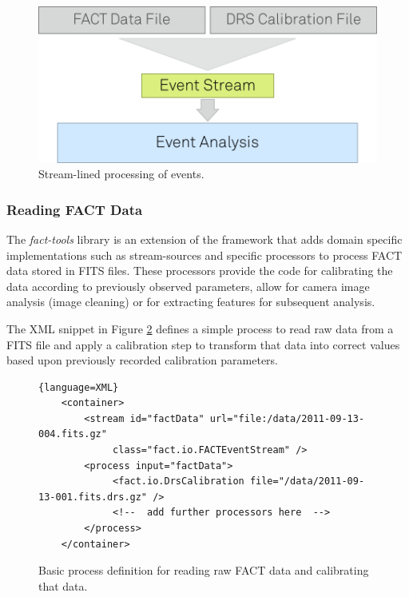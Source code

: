 %

\begin{figure}[h!]
\begin{center}
\includegraphics[scale=0.2]{fact-event-stream}
\end{center}
\caption{\label{fig:eventStream}Stream-lined processing of events.}
\end{figure}





\subsubsection{Reading FACT Data}
The {\em fact-tools} library is an extension of the \streams framework that
adds domain specific implementations such as stream-sources and specific 
processors to process FACT data stored in FITS files. These processors provide
the code for calibrating the data according to previously observed parameters,
allow for camera image analysis (image cleaning) or for extracting features
for subsequent analysis.

The XML snippet in Figure \ref{fig:readFACTxml} defines a simple process to
read raw data from a FITS file and apply a calibration step to transform that
data into correct values based upon previously recorded calibration parameters.

\begin{figure}[h!]
\begin{lstlisting}{language=XML}
    <container>
        <stream id="factData" url="file:/data/2011-09-13-004.fits.gz"
             class="fact.io.FACTEventStream" />
        <process input="factData">
             <fact.io.DrsCalibration file="/data/2011-09-13-001.fits.drs.gz" />
             <!--  add further processors here  -->
        </process>
    </container>
\end{lstlisting}
\caption{\label{fig:readFACTxml}Basic process definition for reading raw FACT data
and calibrating that data.}
\end{figure}

